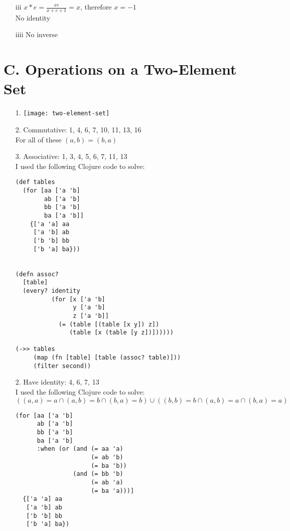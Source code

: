 \begin{enumerate}
\begin{enumerate}
\item[iii]
$x*e=\frac{xe}{x+e+1}=x \text{, therefore } x=-1$ \\
No identity

\item[iiii]
No inverse

\end{enumerate}


\end{enumerate}

\section*{C. Operations on a Two-Element Set}

\begin{enumerate}

\item[1.]
\texttt{[image: two-element-set]}

\item[2.]
Commutative: 1, 4, 6, 7, 10, 11, 13, 16 \\
For all of these $(a,b) = (b,a)$

\item[3.]
Associative: 1, 3, 4, 5, 6, 7, 11, 13 \\
I used the following Clojure code to solve:
\begin{verbatim}
(def tables
  (for [aa ['a 'b]
        ab ['a 'b]
        bb ['a 'b]
        ba ['a 'b]]
    {['a 'a] aa
     ['a 'b] ab
     ['b 'b] bb
     ['b 'a] ba}))


(defn assoc?
  [table]
  (every? identity
          (for [x ['a 'b]
                y ['a 'b]
                z ['a 'b]]
            (= (table [(table [x y]) z])
               (table [x (table [y z])])))))

(->> tables
     (map (fn [table] [table (assoc? table)]))
     (filter second))
\end{verbatim}

\item[2.]
Have identity: 4, 6, 7, 13  \\
I used the following Clojure code to solve:
\begin{equation}
((a,a)=a \cap (a,b)=b \cap (b,a)=b) \cup ((b,b)=b  \cap (a,b)=a \cap (b,a)=a)
\end{equation}
\begin{verbatim}
(for [aa ['a 'b]
      ab ['a 'b]
      bb ['a 'b]
      ba ['a 'b]
      :when (or (and (= aa 'a)
                     (= ab 'b)
                     (= ba 'b))
                (and (= bb 'b)
                     (= ab 'a)
                     (= ba 'a)))]
  {['a 'a] aa
   ['a 'b] ab
   ['b 'b] bb
   ['b 'a] ba})
\end{verbatim}


\end{enumerate}

